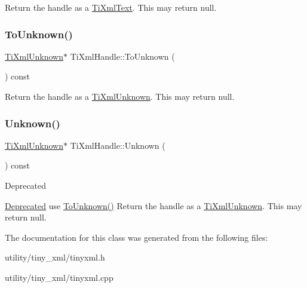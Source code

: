 Return the handle as a \hyperlink{class_ti_xml_text}{Ti\+Xml\+Text}. This may return null. \hypertarget{class_ti_xml_handle_a450ec91dac1ded02d72eb918d062ad31}{}\label{class_ti_xml_handle_a450ec91dac1ded02d72eb918d062ad31} 
\subsubsection{\texorpdfstring{To\+Unknown()}{ToUnknown()}}
{\footnotesize\ttfamily \hyperlink{class_ti_xml_unknown}{Ti\+Xml\+Unknown}$\ast$ Ti\+Xml\+Handle\+::\+To\+Unknown (\begin{DoxyParamCaption}{ }\end{DoxyParamCaption}) const\hspace{0.3cm}{\ttfamily [inline]}}

Return the handle as a \hyperlink{class_ti_xml_unknown}{Ti\+Xml\+Unknown}. This may return null. \hypertarget{class_ti_xml_handle_a12b32f098c7daa5facbc04e9618262c5}{}\label{class_ti_xml_handle_a12b32f098c7daa5facbc04e9618262c5} 
\subsubsection{\texorpdfstring{Unknown()}{Unknown()}}
{\footnotesize\ttfamily \hyperlink{class_ti_xml_unknown}{Ti\+Xml\+Unknown}$\ast$ Ti\+Xml\+Handle\+::\+Unknown (\begin{DoxyParamCaption}{ }\end{DoxyParamCaption}) const\hspace{0.3cm}{\ttfamily [inline]}}

\begin{DoxyRefDesc}{Deprecated}
\item[\hyperlink{deprecated__deprecated000004}{Deprecated}]use \hyperlink{class_ti_xml_handle_a450ec91dac1ded02d72eb918d062ad31}{To\+Unknown()} Return the handle as a \hyperlink{class_ti_xml_unknown}{Ti\+Xml\+Unknown}. This may return null. \end{DoxyRefDesc}


The documentation for this class was generated from the following files\+:\begin{DoxyCompactItemize}
\item 
utility/tiny\+\_\+xml/tinyxml.\+h\item 
utility/tiny\+\_\+xml/tinyxml.\+cpp\end{DoxyCompactItemize}
